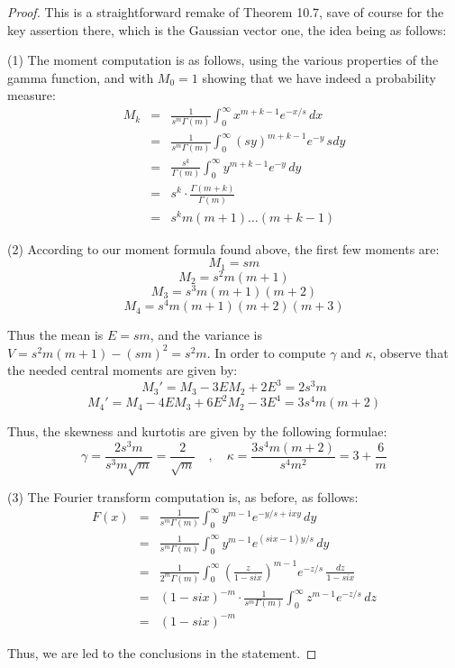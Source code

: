 \documentclass[12pt]{amsbook}
\begin{document}
\begin{proof}
This is a straightforward remake of Theorem 10.7, save of course for the key assertion there, which is the Gaussian vector one, the idea being as follows:

\medskip

(1) The moment computation is as follows, using the various properties of the gamma function, and with $M_0=1$ showing that we have indeed a probability measure:
\begin{eqnarray*}
M_k
&=&\frac{1}{s^m\Gamma(m)}\int_0^\infty x^{m+k-1}e^{-x/s}\,dx\\
&=&\frac{1}{s^m\Gamma(m)}\int_0^\infty (sy)^{m+k-1}e^{-y}\,sdy\\
&=&\frac{s^k}{\Gamma(m)}\int_0^\infty y^{m+k-1}e^{-y}\,dy\\
&=&s^k\cdot\frac{\Gamma(m+k)}{\Gamma(m)}\\
&=&s^km(m+1)\ldots(m+k-1)
\end{eqnarray*}

(2) According to our moment formula found above, the first few moments are:
$$M_1=sm$$
$$M_2=s^2m(m+1)$$
$$M_3=s^3m(m+1)(m+2)$$
$$M_4=s^4m(m+1)(m+2)(m+3)$$

Thus the mean is $E=sm$, and the variance is $V=s^2m(m+1)-(sm)^2=s^2m$. In order to compute $\gamma$ and $\kappa$, observe that the needed central moments are given by:
$$M_3'=M_3-3EM_2+2E^3=2s^3m$$
$$M_4'=M_4-4EM_3+6E^2M_2-3E^4=3s^4m(m+2)$$

Thus, the skewness and kurtotis are given by the following formulae:
$$\gamma=\frac{2s^3m}{s^3m\sqrt{m}}=\frac{2}{\sqrt{m}}\quad,\quad\kappa=\frac{3s^4m(m+2)}{s^4m^2}=3+\frac{6}{m}$$

(3) The Fourier transform computation is, as before, as follows:
\begin{eqnarray*}
F(x)
&=&\frac{1}{s^m\Gamma(m)}\int_0^\infty y^{m-1}e^{-y/s+ixy}\,dy\\
&=&\frac{1}{s^m\Gamma(m)}\int_0^\infty y^{m-1}e^{(six-1)y/s}\,dy\\
&=&\frac{1}{2^m\Gamma(m)}\int_0^\infty\left(\frac{z}{1-six}\right)^{m-1}e^{-z/s}\,\frac{dz}{1-six}\\
&=&(1-six)^{-m}\cdot\frac{1}{s^m\Gamma(m)}\int_0^\infty z^{m-1}e^{-z/s}\,dz\\
&=&(1-six)^{-m}
\end{eqnarray*}

Thus, we are led to the conclusions in the statement.
\end{proof}
\end{document}
